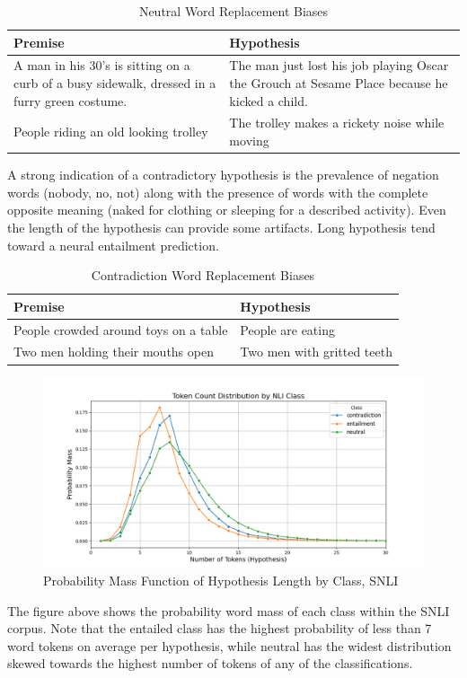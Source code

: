 \documentclass[11pt]{article}
\begin{document}
\begin{table}[h!]
    \centering
    \begin{tabularx}{0.45\textwidth} { 
  | >{\raggedright\arraybackslash}X 
  | >{\raggedright\arraybackslash}X | }
    \hline
    Premise & Hypothesis \\
    \hline\hline
        A man in his 30's is sitting on a curb of a busy sidewalk, dressed in a furry green costume. & The man just lost his job playing Oscar the Grouch at Sesame Place because he kicked a child. \\
        \hline
       People riding an old looking trolley & The trolley makes a rickety noise while moving \\
        \hline
    \end{tabularx}
    \caption{Neutral Word Replacement Biases}
    \label{tab:NWRB}
\end{table}
A strong indication of a contradictory hypothesis is the prevalence of negation words (nobody, no, not) along with the presence of words with the complete opposite meaning (naked for clothing or sleeping for a described activity). Even the length of the hypothesis can provide some artifacts. Long hypothesis tend toward a neural entailment prediction.  \citealp{princeton}

\begin{table}[h!]
    \centering
    \begin{tabularx}{0.45\textwidth} { 
  | >{\raggedright\arraybackslash}X 
  | >{\raggedright\arraybackslash}X | }
    \hline
    Premise & Hypothesis \\
    \hline\hline
        People crowded around toys on a table & People are eating \\
        \hline
       Two men holding their mouths open & Two men with gritted teeth \\
        \hline
    \end{tabularx}
    \caption{Contradiction Word Replacement Biases}
    \label{tab:CWRB}
\end{table}
\begin{figure}[h!]
    \centering
    \includegraphics[width=1.0\linewidth]{Figure_tokenvsprobmass.png}
    \caption{Probability Mass Function of Hypothesis Length by Class, SNLI}
    \label{fig:}
\end{figure}
The figure above shows the probability word mass of each class within the SNLI corpus. Note that the entailed class has the highest probability of less than 7 word tokens on average per hypothesis, while neutral has the widest distribution skewed towards the highest number of tokens of any of the classifications.
\end{document}
